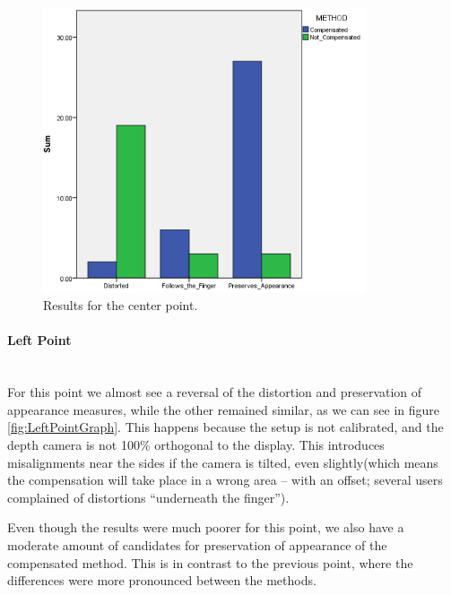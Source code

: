 \documentclass[]{article}
\begin{document}
\begin{figure}[!h]
    \centering
    \includegraphics[width=0.85\textwidth]{figures/results/CenterPointGraph.PNG}
    \caption{Results for the center point.}
    \label{fig:CenterPointGraph}
\end{figure}

\paragraph{Left Point}\mbox{}\\

For this point we almost see a reversal of the distortion and preservation of appearance measures, while the other remained similar, as we can see in figure \ref{fig:LeftPointGraph}. This happens because the setup is not calibrated, and the depth camera is not 100\% orthogonal to the display. This introduces misalignments near the sides if the camera is tilted, even slightly(which means the compensation will take place in a wrong area – with an offset; several users complained of distortions “underneath the finger”).

Even though the results were much poorer for this point, we also have a moderate amount of candidates for preservation of appearance of the compensated method. This is in contrast to the previous point, where the differences were more pronounced between the methods.
\end{document}
